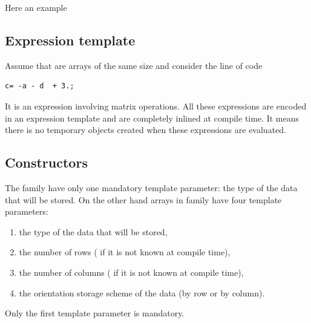 \documentclass[a4paper,10pt]{article}
\begin{document}
Here an example

\begin{minipage}[t]{0.66\textwidth}

\end{minipage}
\hspace{0.2cm}
\begin{minipage}[t]{0.33\textwidth}
\addtocounter{lstlisting}{-1}

\end{minipage}

\subsection{Expression template}

Assume that  are arrays of the same size and consider the line of
code
\begin{lstlisting}[style=customcpp]
c= -a - d  + 3.;
\end{lstlisting}
It is an expression involving matrix operations. All these expressions
are encoded in an expression template and are completely inlined at compile
time. It means there is no temporary objects created when these expressions
are evaluated.

\subsection{Constructors}

The  family have only one mandatory template parameter: the type
of the data that will be stored. On the other hand arrays in 
family have four template parameters:
\begin{enumerate}
\item the type of the data that will be stored,
\item the number of rows ( if it is not known at compile time),
\item the number of columns ( if it is not known at compile time),
\item the orientation storage scheme of the data (by row or by column).
\end{enumerate}
Only the first template parameter is mandatory.

\begin{minipage}[t]{0.99\textwidth}

\end{minipage}
\end{document}
